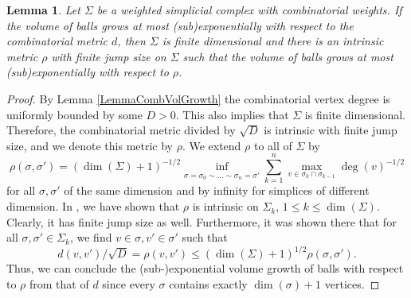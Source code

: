 \documentclass[10pt]{amsart}
\newtheorem{lemma}[theorem]{Lemma}
\theoremstyle{definition}
\begin{document}
\begin{lemma}\label{LemmaSubexpVolGrowthSC}
      Let $\Sigma$ be a weighted simplicial complex with combinatorial weights. If the  volume of balls  grows at most (sub)exponentially with respect to the combinatorial metric $d$, then $\Sigma$ is finite dimensional and there is an intrinsic metric $\rho$ with finite jump size on $\Sigma$ such that the volume of balls grows at most (sub)exponentially with respect to $\rho$. 
\end{lemma}
\begin{proof}
By Lemma \ref{LemmaCombVolGrowth} the combinatorial vertex degree is uniformly bounded by some $D>0.$ This also implies that $\Sigma$ is finite dimensional. Therefore, the combinatorial metric divided by $\sqrt{D}$ is intrinsic with finite jump size, and we denote this metric by $\rho$. We extend $\rho $ to all of $\Sigma$ by
\[\rho(\sigma,\sigma') =(\dim(\Sigma)+1)^{-1/2}\inf_{\sigma=\sigma_{0}\sim\ldots\sim \sigma_{n}=\sigma'}\sum_{k=1}^{n}\max_{v\in\sigma_k\cap\sigma_{k-1} }\deg(v)^{-1/2}
 \]
for all $\sigma,\sigma'$ of the same dimension and by infinity for simplices of different dimension. In \cite[Proof of Theorem~6.1]{BK}, we have shown that $\rho$ is intrinsic on $\Sigma_k$, $1\le k\le \dim(\Sigma).$ Clearly, it has finite jump size as well. Furthermore, it was shown there that for all $\sigma,\sigma'\in\Sigma_k$, we find $v\in\sigma,v'\in\sigma'$ such that 
\[d(v,v')\slash\sqrt D = \rho(v,v')\leq  (\dim(\Sigma)+1)^{1/2}\rho(\sigma,\sigma').\]
Thus, we can conclude the (sub-)exponential volume growth of balls with respect to $\rho$ from that of $d$ since every $\sigma$ contains exactly $\dim(\sigma)+1$ vertices.
\end{proof}
\end{document}
